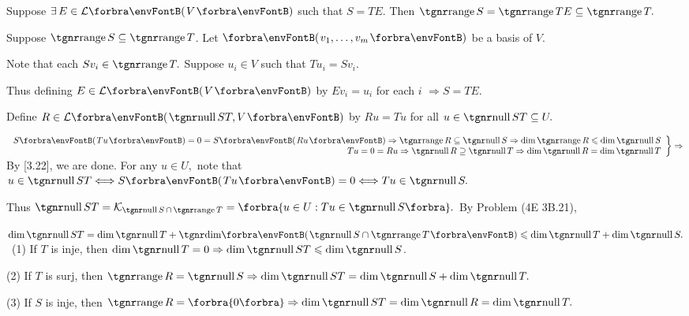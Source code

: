 \documentclass[a4paper, 11pt, UTF8]{article}
\begin{document}
\begin{large}
\par\quad
Suppose $\exists\,E\in\Lm{V}$ such that $S = TE$. Then $\range S=\range TE\subseteq\range T.$\par\quad
Suppose $\range S\subseteq\range T$. Let $\Par{v_1,\dots,v_m}$ be a basis of $V.$\par\quad
Note that each $Sv_i\in\range T.$ Suppose $u_i\in V$ such that $Tu_i=Sv_i.$\par\quad
Thus defining $E\in\Lm{V}$ by $Ev_i=u_i$ for each $i$ $\Rightarrow S=TE.$\PfEnd
\SepLine

\par\quad
Define $R\in\Lm{\null ST,V}$ by $Ru=Tu$ for all $u\in\null ST\subseteq U.$\par\quad
$\MathRightBrace{r}{S\Par{Tu}=0=S\Par{Ru}\Rightarrow\range R\subseteq\null S\Rightarrow\dim\range R\leqslant\dim\null S\\ Tu=0=Ru\Rightarrow\null R\supseteq\null T\Rightarrow\dim\null R=\dim\null T}\Rightarrow$ By [3.22], we are done.\PfEnd[-23pt]\vspace{10pt}\quad
\Or For any $u\in U,$ note that $u\in\null ST\Longleftrightarrow S\Par{Tu}=0\Longleftrightarrow Tu\in\null S.$\par\quad
Thus $\null ST=\mathcal{K}_{\null S\,\cap\,\range T}=\Bra{u\in U:Tu\in\null S}.$ By Problem (4E 3B.21),\par\quad
$\dim\null ST=\dim\null T+\Dim\Par{\null S\cap\range T}\leqslant\dim\null T+\dim\null S.$\vspace{4pt}\PfEnd
\Corollary \,\,\,(1) If $T$ is inje, then $\dim\null T=0\Rightarrow\dim\null ST\leqslant\dim\null S$.\par\Blind{\Corollary \,\,}
(2) If $T$ is surj, then $\range R=\null S\Rightarrow\dim\null ST=\dim\null S+\dim\null T.$\par\Blind{\Corollary \,\,}
(3) If $S$ is inje, then $\range R=\zeroSubs\Rightarrow \dim\null ST=\dim\null R=\dim\null T.$
\SepLine


\end{large}
\end{document}
